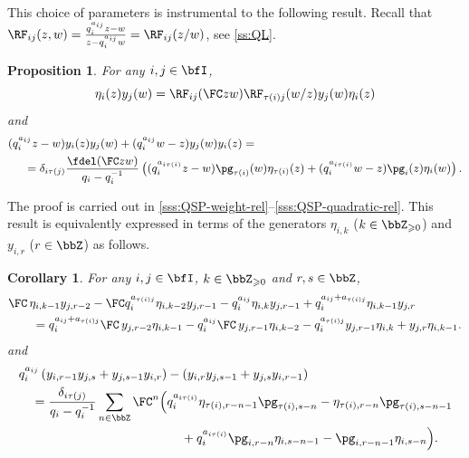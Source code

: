 \documentclass[reqno]{amsart}
\numberwithin{equation}{section}
\newtheorem*{proposition}{Proposition}
\newtheorem*{corollary}{Corollary}
\begin{document}
This choice of parameters is instrumental to the following result.
Recall that $\RF_{ij}(z,w)=\frac{q_i^{a_{ij}}z-w}{z-q_i^{a_{ij}}w}=\RF_{ij}(z/w)$, see \ref{ss:QL}.
\begin{proposition}
For any $i,j\in\bfI$,
\begin{equation}\label{eq:weight-rel-eta-y}
\eta_i(z)y_j(w)=\RF_{ij}(\FC zw)\RF_{\tau(i)j}(w/z)y_j(w)\eta_i(z)	
\end{equation}
and
\begin{equation}\label{eq:quadratic-y-y}
\small
\begin{aligned}
	(q_i^{a_{ij}}z-w)&y_i(z)y_{j}(w)+(q_i^{a_{ij}}w-z)y_{j}(w)y_i(z)=\\
	&\hspace{-1.15cm}=\delta_{i\tau(j)}\frac{\fdel(\FC zw)}{q_i-q_i^{-1}}\left((q_i^{a_{i\tau(i)}}z-w)\pg_{\tau(i)}(w)\eta_{\tau(i)}(z)
	+(q_i^{a_{i\tau(i)}}w-z)\pg_i(z)\eta_{i}(w)\right).
\end{aligned}
\end{equation}
\end{proposition}
The proof is carried out in \ref{sss:QSP-weight-rel}--\ref{sss:QSP-quadratic-rel}.
This result is equivalently expressed in terms of the generators $\eta_{i,k}$ ($k\in\bbZ_{\geqslant0}$) and $y_{i,r}$ ($r\in\bbZ$) as follows.
\begin{corollary}\label{cor:explicit-rels}
For any $i,j\in\bfI$, $k\in\bbZ_{\geqslant0}$ and $r,s\in\bbZ$,
	\begin{equation}\label{eq:weight-y-modes}
	\begin{aligned}
		&
		\FC\,\eta_{i,k-1}y_{j,r-2}
		-
		\FC q_i^{a_{\tau(i)j}}\eta_{i,k-2}y_{j,r-1}
		-
		q_i^{a_{ij}}\eta_{i,k}y_{j,r-1}
		+
		q_i^{a_{ij}+a_{\tau(i)j}}\eta_{i,k-1}y_{j,r}
		\nonumber\\
		&\qquad =
		q_i^{a_{ij}+a_{\tau(i)j}}\FC\,y_{j,r-2}\eta_{i,k-1}
		-
		q_i^{a_{ij}}\FC\,y_{j,r-1}\eta_{i,k-2}
		-
		q_i^{a_{\tau(i)j}}y_{j,r-1}\eta_{i,k}
		+
		y_{j,r}\eta_{i,k-1}.
	\end{aligned}
	\end{equation}
	and
	\begin{equation}\label{eq:quadratic-y-modes}
	\begin{aligned}
		&q_i^{a_{ij}}
		\left(
		y_{i,r-1}y_{j,s}
		+
		y_{j,s-1}y_{i,r}
		\right)
		-
		\left(
		y_{i,r}y_{j,s-1}
		+
		y_{j,s}y_{i,r-1}
		\right)
		\\
		&\quad =
		\frac{\delta_{i\tau(j)}}{q_i-q_i^{-1}}
		\sum_{n\in\bbZ}
		\FC^n
		\Big(
		q_i^{a_{i\tau(i)}}
		\eta_{\tau(i),r-n-1}
		\pg_{\tau(i),s-n}
		-
		\eta_{\tau(i),r-n}
		\pg_{\tau(i),s-n-1}
		\\
		&\hspace{4.5cm}
		+
		q_i^{a_{i\tau(i)}}
		\pg_{i,r-n}
		\eta_{i,s-n-1}
		-
		\pg_{i,r-n-1}
		\eta_{i,s-n}
		\Big).
	\end{aligned}
	\end{equation}
\end{corollary}
\end{document}
